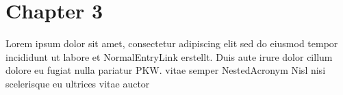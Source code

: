 \documentclass[../main.tex]{subfiles}
\begin{document}
\newpage
\section{Chapter 3} \label{sec:C3}
Lorem ipsum dolor sit amet, consectetur adipiscing elit  sed do eiusmod tempor incididunt ut
labore et \gls{NormalEntryLink}  erstellt.
Duis aute irure dolor cillum dolore eu fugiat nulla pariatur \gls{PKW}.
vitae semper \gls{NestedAcronym} Nisl nisi scelerisque eu ultrices vitae auctor 

\end{document}
